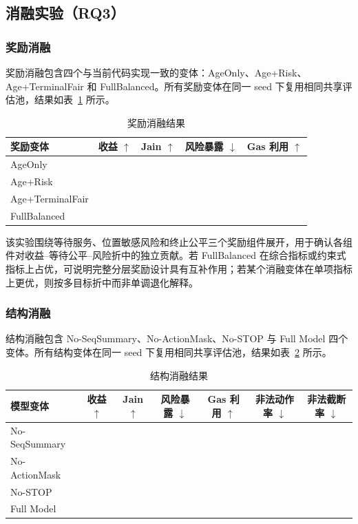 \subsection{消融实验（RQ3）}

\subsubsection{奖励消融}

奖励消融包含四个与当前代码实现一致的变体：AgeOnly、Age+Risk、Age+TerminalFair 和 FullBalanced。所有奖励变体在同一 seed 下复用相同共享评估池，结果如表~\ref{tab:ablation_reward} 所示。

\begin{table}[htbp]
\centering
\caption{奖励消融结果}
\label{tab:ablation_reward}
\begin{tabular}{lcccc}
\toprule
奖励变体 & 收益 $\uparrow$ & Jain $\uparrow$ & 风险暴露 $\downarrow$ & Gas 利用 $\uparrow$ \\
\midrule
AgeOnly          & \TODO{} & \TODO{} & \TODO{} & \TODO{} \\
Age+Risk         & \TODO{} & \TODO{} & \TODO{} & \TODO{} \\
Age+TerminalFair & \TODO{} & \TODO{} & \TODO{} & \TODO{} \\
FullBalanced     & \TODO{} & \TODO{} & \TODO{} & \TODO{} \\
\bottomrule
\end{tabular}
\end{table}

该实验围绕等待服务、位置敏感风险和终止公平三个奖励组件展开，用于确认各组件对收益--等待公平--风险折中的独立贡献。若 FullBalanced 在综合指标或约束式指标上占优，可说明完整分层奖励设计具有互补作用；若某个消融变体在单项指标上更优，则按多目标折中而非单调退化解释。

\subsubsection{结构消融}

结构消融包含 No-SeqSummary、No-ActionMask、No-STOP 与 Full Model 四个变体。所有结构变体在同一 seed 下复用相同共享评估池，结果如表~\ref{tab:ablation_struct} 所示。

\begin{table}[htbp]
\centering
\caption{结构消融结果}
\label{tab:ablation_struct}
\begin{tabular}{lcccccc}
\toprule
模型变体 & 收益 $\uparrow$ & Jain $\uparrow$ & 风险暴露 $\downarrow$ & Gas 利用 $\uparrow$ & 非法动作率 $\downarrow$ & 非法截断率 $\downarrow$ \\
\midrule
No-SeqSummary & \TODO{} & \TODO{} & \TODO{} & \TODO{} & \TODO{} & \TODO{} \\
No-ActionMask & \TODO{} & \TODO{} & \TODO{} & \TODO{} & \TODO{} & \TODO{} \\
No-STOP       & \TODO{} & \TODO{} & \TODO{} & \TODO{} & \TODO{} & \TODO{} \\
Full Model    & \TODO{} & \TODO{} & \TODO{} & \TODO{} & \TODO{} & \TODO{} \\
\bottomrule
\end{tabular}
\end{table}

